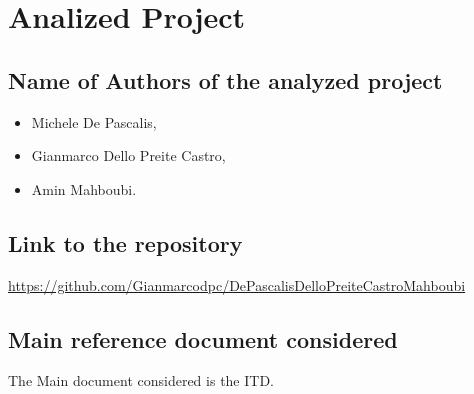 \chapter{Analized Project}
\section{Name of Authors of the analyzed project}
\begin{itemize}
\item Michele De Pascalis,  
\item Gianmarco Dello Preite Castro,
\item Amin Mahboubi.
\end{itemize}
\section{Link to the repository}
\url{https://github.com/Gianmarcodpc/DePascalisDelloPreiteCastroMahboubi}
\section{Main reference document considered}
The Main document considered is the ITD.